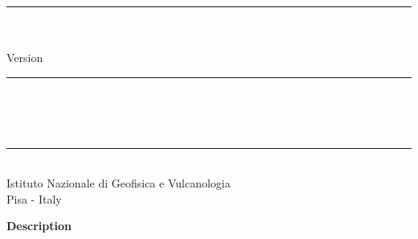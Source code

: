 
\thispagestyle{empty}

\vspace*{0.3in}

\begin{centering}
  \rule{6in}{0.04in}				\\	\vspace{0.25in}
  {\Huge \PDAC\ \RMTITLE}			\\	\vspace{0.25in}
  {\Large Version \PDACVERSION}			\\	\vspace{0.20in}
  \rule{6in}{0.04in}				\\	\vspace{0.25in}
  {\Large \PDACAUTHORS}				\\	\vspace{0.20in}
  \PDACDATE					\\	\vspace{0.20in}
  \rule{6in}{0.04in}				\\	\vspace{0.25in}
  {\large       Istituto Nazionale di Geofisica e Vulcanologia} \\ 
  {\large       Pisa - Italy}      \\ 
\end{centering}
\vspace{0.2in}

\begin{center}
  {\Large \bf Description}
\end{center}

\noindent \RMDESC

